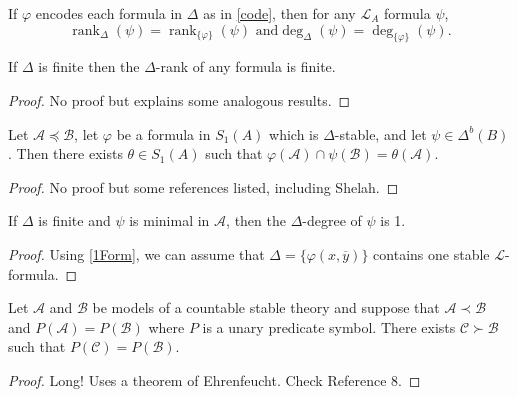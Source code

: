 \documentclass{article}
\DeclareMathOperator{\rank}{rank}
\let\mc\mathcal
\begin{document}
\begin{corollary}\label{1Form}
    If $\varphi$ encodes each formula in $\Delta$ as in \autoref{code}, then for any $\mc{L}_A$ formula $\psi$,
    \[ \rank_{\Delta}(\psi) = \rank_{\{ \varphi \}}(\psi) \text{ and}
    \deg_{\Delta}(\psi) = \deg_{\{ \varphi \}}(\psi). \]
\end{corollary}

\begin{lemma}
    If $\Delta$ is finite then the $\Delta$-rank of any formula is finite.
\end{lemma}
\begin{proof}
    No proof but explains some analogous results.
\end{proof}

\begin{lemma}
    Let $\mc{A} \preceq \mc{B}$, let $\varphi$ be a formula in $S_1(A)$ which is $\Delta$-stable, and let $\psi \in \Delta^b(B)$. Then there exists $\theta \in S_1(A)$ such that $\varphi(\mc{A}) \cap \psi(\mc{B}) = \theta(\mc{A})$.
\end{lemma}
\begin{proof}
    No proof but some references listed, including Shelah.
\end{proof}

\begin{lemma}
    If $\Delta$ is finite and $\psi$ is minimal in $\mc{A}$, then the $\Delta$-degree of $\psi$ is 1.
\end{lemma}
\begin{proof}
    Using \autoref{1Form}, we can assume that $\Delta = \{ \varphi(x, \overline{y}) \}$ contains one stable $\mc{L}$-formula.
\end{proof}

\begin{theorem}
    Let $\mc{A}$ and $\mc{B}$ be models of a countable stable theory and suppose that $\mc{A} \prec \mc{B}$ and $P(\mc{A}) = P(\mc{B})$ where $P$ is a unary predicate symbol. There exists $\mc{C} \succ \mc{B}$ such that $P(\mc{C}) = P(\mc{B})$.
\end{theorem}
\begin{proof}
    Long! Uses a theorem of Ehrenfeucht. Check Reference 8.
\end{proof}
\end{document}
